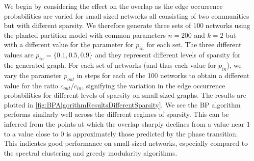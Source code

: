 We begin by considering the effect on the overlap as the edge occurrence probabilities are varied for small sized networks all consisting of two communities but with different sparsity.
We therefore generate three sets of 100 networks using the planted partition model with common parameters $n = 200$ and $k = 2$ but with a different value for the parameter for $p_{in}$ for each set.
The three different values are $p_{in} = \{0.1, 0.5, 0.9\}$ and they represent different levels of sparsity for the generated graph.
For each set of networks (and thus each value for $p_{in}$), we vary the parameter $p_{out}$ in steps for each of the 100 networks to obtain a different value for the ratio $c_{out}/c_{in}$, signifying the variation in the edge occurrence probabilities for different levels of sparsity on small-sized graphs.
The results are plotted in \cref{fig:BPAlgorithmResultsDifferentSparsity}.
We see the BP algorithm performs similarly well across the different regimes of sparsity.
This can be inferred from the points at which the overlap sharply declines from a value near 1 to a value close to 0 is approximately those predicted by the phase transition.
This indicates good performance on small-sized networks, especially compared to the spectral clustering and greedy modularity algorithms.

